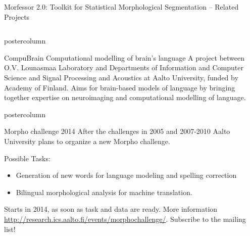 \documentclass[final]{beamer} %
\newcommand{\collspace}{\vspace{6mm}}
\begin{document}
\begin{frame}{Morfessor 2.0: Toolkit for Statistical Morphological Segmentation -- Related Projects}
\begin{columns}
\begin{column}{.49\textwidth}
\begin{beamercolorbox}[center,wd=\textwidth]{postercolumn}
\begin{block}{CompuBrain}
Computational modelling of brain's language
A project between O.V. Lounasmaa Laboratory and Departments of
Information and Computer Science and Signal Processing and
 Acoustics at Aalto University, funded by Academy of Finland. Aims
 for brain-based models of language by bringing together expertise
 on neuroimaging and computational modelling of language.
            \end{block}
            
	\end{beamercolorbox}
\vfill
\collspace


  \begin{beamercolorbox}[center,wd=\textwidth]{postercolumn}
 \begin{block}{Morpho challenge 2014}
            After the challenges in 2005 and 2007-2010 Aalto University plans to organize a new Morpho challenge.

	Possible Tasks:       \begin{itemize}
		\item Generation of new words for language modeling and spelling correction
\item Bilingual morphological analysis for machine translation.
              \end{itemize}  

Starts in 2014, as soon as task and data are ready. More information \url{http://research.ics.aalto.fi/events/morphochallenge/}. Subscribe to the mailing list!
            \end{block}
            
	\end{beamercolorbox}




\end{column}
\end{columns}
\end{frame}
\end{document}
